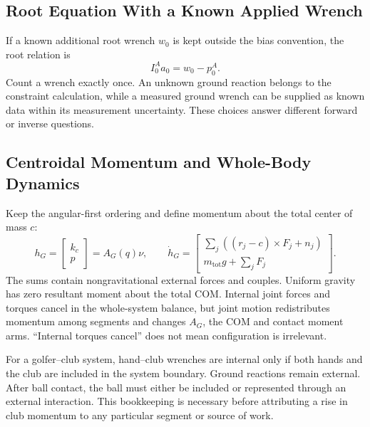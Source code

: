 \subsection{Root Equation With a Known Applied Wrench}
\label{subsec:base_acceleration}

If a known additional root wrench $w_0$ is kept outside the bias convention, the root relation is
\begin{equation}
 I_0^A a_0=w_0-p_0^A.
 \label{eq:floating_base_accel}
\end{equation}
Count a wrench exactly once. An unknown ground reaction belongs to the constraint calculation, while a measured ground wrench can be supplied as known data within its measurement uncertainty. These choices answer different forward or inverse questions.

\subsection{Centroidal Momentum and Whole-Body Dynamics}
\label{subsec:centroidal_momentum}

Keep the angular-first ordering and define momentum about the total center of mass $c$:
\begin{equation}
 h_G=\begin{bmatrix}k_c\\p\end{bmatrix}=A_G(q)\nu,\qquad
 \dot h_G=
 \begin{bmatrix}
 \sum_j((r_j-c)\times F_j+n_j)\\
 m_{\mathrm{tot}}g+\sum_j F_j
 \end{bmatrix}.
 \label{eq:centroidal_momentum}
\end{equation}
The sums contain nongravitational external forces and couples. Uniform gravity has zero resultant moment about the total COM. Internal joint forces and torques cancel in the whole-system balance, but joint motion redistributes momentum among segments and changes $A_G$, the COM and contact moment arms. ``Internal torques cancel'' does not mean configuration is irrelevant.

For a golfer--club system, hand--club wrenches are internal only if both hands and the club are included in the system boundary. Ground reactions remain external. After ball contact, the ball must either be included or represented through an external interaction. This bookkeeping is necessary before attributing a rise in club momentum to any particular segment or source of work.

